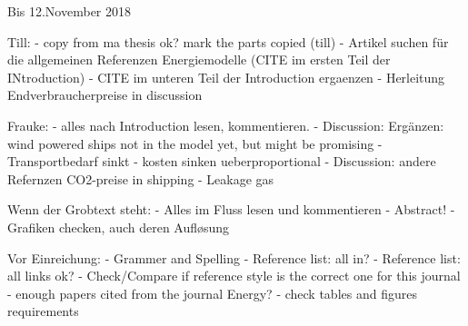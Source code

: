 Bis 12.November 2018

Till:
- copy from ma thesis ok? mark the parts copied (till)
- Artikel suchen für die allgemeinen Referenzen Energiemodelle (CITE im ersten Teil der INtroduction)
- CITE im unteren Teil der Introduction ergaenzen
- Herleitung Endverbraucherpreise in discussion

Frauke:
- alles nach Introduction lesen, kommentieren.
- Discussion: Ergänzen: wind powered ships not in the model yet, but might be promising
- Transportbedarf sinkt - kosten sinken ueberproportional
- Discussion: andere Refernzen CO2-preise in shipping
- Leakage gas

Wenn der Grobtext steht:
- Alles im Fluss lesen und kommentieren
- Abstract!
- Grafiken checken, auch deren Aufløsung


Vor Einreichung:
- Grammer and Spelling
- Reference list: all in?
- Reference list: all links ok?
- Check/Compare if reference style is the correct one for this journal
- enough papers cited from the journal Energy?
- check tables and figures requirements

